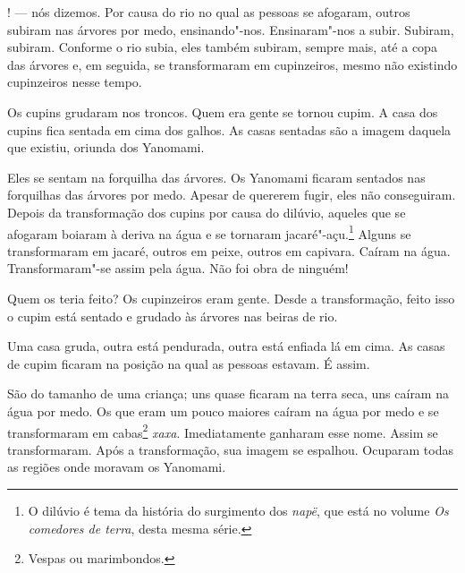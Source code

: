 

! --- nós dizemos. 
Por causa do rio no qual as pessoas se afogaram, outros subiram nas
árvores por medo, ensinando"-nos. Ensinaram"-nos a subir. Subiram,
subiram. Conforme o rio subia, eles também subiram, sempre mais, até a
copa das árvores e, em seguida, se transformaram em cupinzeiros, mesmo
não existindo cupinzeiros nesse tempo. 

Os cupins grudaram nos troncos. Quem era gente se tornou cupim. A casa
dos cupins fica sentada em cima dos galhos. As casas sentadas são a
imagem daquela que existiu, oriunda dos Yanomami. 

Eles se sentam na forquilha das árvores. Os Yanomami ficaram sentados
nas forquilhas das árvores por medo. Apesar de quererem fugir, eles não
conseguiram. Depois da transformação dos cupins por causa do dilúvio,
aqueles que se afogaram boiaram à deriva na água e se tornaram
jacaré"-açu.\footnote{  O dilúvio é tema da história do surgimento dos \emph{napë}, que está no volume \emph{Os comedores de terra}, desta mesma série.} Alguns se transformaram em jacaré, outros em peixe, outros
em capivara. Caíram na água. Transformaram"-se
assim pela água. Não foi obra de ninguém! 

Quem os teria feito? Os cupinzeiros eram gente. Desde a
transformação, feito isso o cupim está sentado e grudado às árvores nas
beiras de rio.

Uma casa gruda, outra está pendurada, outra está enfiada lá em cima. As
casas de cupim ficaram na posição na qual as pessoas estavam.
É assim. 

São do tamanho de uma criança; uns quase ficaram na terra seca, uns
caíram na água por medo. Os que eram um pouco maiores caíram na água por
medo e se transformaram em cabas\footnote{  Vespas ou marimbondos.}  \emph{xaxa}. Imediatamente ganharam esse nome. Assim se transformaram. Após a transformação,
sua imagem se espalhou. Ocuparam todas as regiões onde moravam os
Yanomami. 